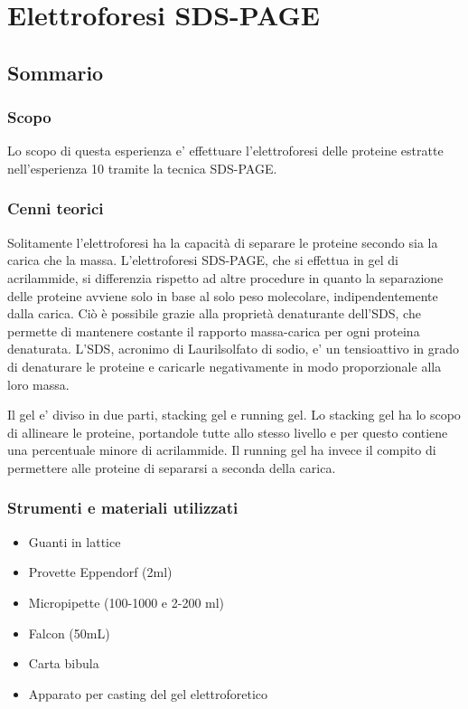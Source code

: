 \section{\LARGE{Elettroforesi SDS-PAGE }}

\vspace{0.6cm}


\subsection{Sommario}

\subsubsection{Scopo}

Lo scopo di questa esperienza e' effettuare l'elettroforesi
delle proteine estratte nell'esperienza 10 tramite la
tecnica SDS-PAGE.

\subsubsection{Cenni teorici}

Solitamente l'elettroforesi ha la capacit\`a di separare le proteine secondo sia
la carica che la massa.
L'elettroforesi SDS-PAGE, che si effettua in gel di acrilammide, si differenzia
rispetto ad altre procedure in quanto la separazione delle proteine
avviene solo in base al solo peso molecolare, indipendentemente dalla carica.
Ci\`o \`e possibile grazie alla propriet\`a denaturante dell'SDS,
che permette di mantenere costante il rapporto massa-carica per ogni proteina denaturata.
L'SDS, acronimo di Laurilsolfato di sodio, e' un tensioattivo in grado di denaturare le proteine e
caricarle negativamente in modo proporzionale alla loro massa.

Il gel e' diviso in due parti, stacking gel e running gel. Lo stacking gel
ha lo scopo di allineare le proteine, portandole tutte allo stesso livello e per
questo contiene una percentuale minore di acrilammide.
Il running gel ha invece il compito di permettere alle proteine di separarsi a
seconda della carica.

\subsubsection{Strumenti e materiali utilizzati}

\begin{itemize}
\item Guanti in lattice
\item Provette Eppendorf (2ml)
\item Micropipette (100-1000 e 2-200 ml)
\item Falcon (50mL)
\item Carta bibula
\item Apparato per casting del gel elettroforetico
\end{itemize}

